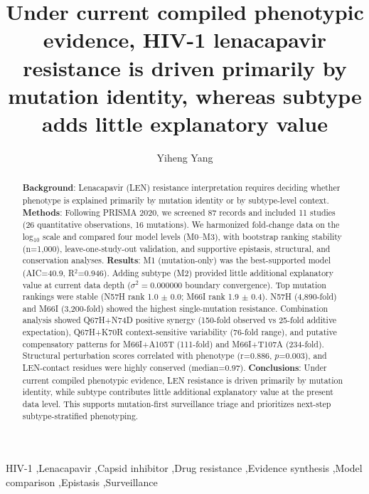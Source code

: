 \documentclass[preprint]{elsarticle}
\begin{document}
\begin{frontmatter}

\title{Under current compiled phenotypic evidence, HIV-1 lenacapavir resistance is driven primarily by mutation identity, whereas subtype adds little explanatory value}

\author[inst1,inst2]{Yiheng Yang}

\address[inst1]{School of Future Technology, Dalian University of Technology, Dalian, China}
\address[inst2]{School of Bioengineering, Dalian University of Technology, Dalian, China}

\begin{abstract}
\textbf{Background}: Lenacapavir (LEN) resistance interpretation requires deciding whether phenotype is explained primarily by mutation identity or by subtype-level context. 
\textbf{Methods}: Following PRISMA 2020, we screened 87 records and included 11 studies (26 quantitative observations, 16 mutations). We harmonized fold-change data on the log$_{10}$ scale and compared four model levels (M0--M3), with bootstrap ranking stability (n=1,000), leave-one-study-out validation, and supportive epistasis, structural, and conservation analyses.
\textbf{Results}: M1 (mutation-only) was the best-supported model (AIC=40.9, R$^{2}$=0.946). Adding subtype (M2) provided little additional explanatory value at current data depth ($\sigma^2=0.000000$ boundary convergence). Top mutation rankings were stable (N57H rank 1.0 $\pm$ 0.0; M66I rank 1.9 $\pm$ 0.4). N57H (4,890-fold) and M66I (3,200-fold) showed the highest single-mutation resistance. Combination analysis showed Q67H+N74D positive synergy (150-fold observed vs 25-fold additive expectation), Q67H+K70R context-sensitive variability (76-fold range), and putative compensatory patterns for M66I+A105T (111-fold) and M66I+T107A (234-fold). Structural perturbation scores correlated with phenotype (r=0.886, $p$=0.003), and LEN-contact residues were highly conserved (median=0.97).
\textbf{Conclusions}: Under current compiled phenotypic evidence, LEN resistance is driven primarily by mutation identity, while subtype contributes little additional explanatory value at the present data level. This supports mutation-first surveillance triage and prioritizes next-step subtype-stratified phenotyping.
\end{abstract}

\begin{keyword}
HIV-1 \sep Lenacapavir \sep Capsid inhibitor \sep Drug resistance \sep Evidence synthesis \sep Model comparison \sep Epistasis \sep Surveillance
\end{keyword}

\end{frontmatter}
\end{document}
